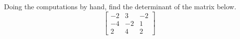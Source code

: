 Doing the computations by hand, find the determinant of the matrix below.
%
\begin{equation*}
\begin{bmatrix}
 -2 & 3 & -2 \\
 -4 & -2 & 1 \\
 2 & 4 & 2
\end{bmatrix}
\end{equation*}